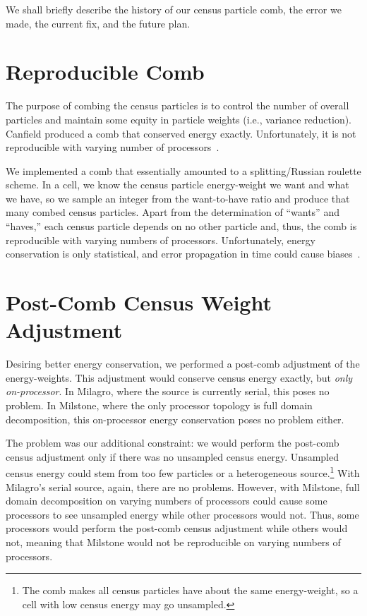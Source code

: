 \documentclass[10pt]{nmemo}
\begin{document}
We shall briefly describe the history of our census particle comb, the 
error we made, the current fix, and the future plan.

\section{Reproducible Comb}

The purpose of combing the census particles is to control the number
of overall particles and maintain some equity in particle weights
(i.e., variance reduction).  Canfield produced a comb that conserved
energy exactly.  Unfortunately, it is not reproducible with varying
number of processors~\cite{ev98}.

We implemented a comb that essentially amounted to a splitting/Russian
roulette scheme.  In a cell, we know the census particle energy-weight
we want and what we have, so we sample an integer from the
want-to-have ratio and produce that many combed census particles.
Apart from the determination of ``wants'' and ``haves,'' each census
particle depends on no other particle and, thus, the comb is
reproducible with varying numbers of processors.  Unfortunately,
energy conservation is only statistical, and error propagation in time
could cause biases~\cite{ev98}.

\section{Post-Comb Census Weight Adjustment}

Desiring better energy conservation, we performed a post-comb
adjustment of the energy-weights.  This adjustment would conserve
census energy exactly, but {\em only on-processor}.  In Milagro, where 
the source is currently serial, this poses no problem.  In Milstone,
where the only processor topology is full domain decomposition, this
on-processor energy conservation poses no problem either.  

The problem was our additional constraint: we would perform the
post-comb census adjustment only if there was no unsampled census
energy.  Unsampled census energy could stem from too few particles or
a heterogeneous source.\footnote{The comb makes all census
  particles have about the same energy-weight, so a cell with low
  census energy may go unsampled.}  With Milagro's serial source,
again, there are no problems.  However, with Milstone, full domain
decomposition on varying numbers of processors could cause some
processors to see unsampled energy while other processors would not.
Thus, some processors would perform the post-comb census adjustment
while others would not, meaning that Milstone would not be
reproducible on varying numbers of processors.
\end{document}
